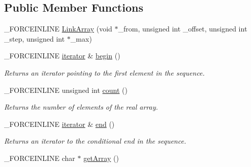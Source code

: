 \subsection*{Public Member Functions}
\begin{DoxyCompactItemize}
\item 
\-\_\-\-F\-O\-R\-C\-E\-I\-N\-L\-I\-N\-E \hyperlink{classbt_1_1_link_array_a1802ab66970e9ad9ab934acc5e391899}{Link\-Array} (void $\ast$\-\_\-from, unsigned int \-\_\-offset, unsigned int \-\_\-step, unsigned int $\ast$\-\_\-max)
\item 
\hypertarget{classbt_1_1_link_array_add85ea16f5d4e6cd0797c6d7ac547327}{\-\_\-\-F\-O\-R\-C\-E\-I\-N\-L\-I\-N\-E \hyperlink{classbt_1_1_link_array_1_1iterator}{iterator} \& \hyperlink{classbt_1_1_link_array_add85ea16f5d4e6cd0797c6d7ac547327}{begin} ()}\label{classbt_1_1_link_array_add85ea16f5d4e6cd0797c6d7ac547327}

\begin{DoxyCompactList}\small\item\em Returns an iterator pointing to the first element in the sequence. \end{DoxyCompactList}\item 
\hypertarget{classbt_1_1_link_array_a8dc1eea5b73b67867c02e471499af9a6}{\-\_\-\-F\-O\-R\-C\-E\-I\-N\-L\-I\-N\-E unsigned int \hyperlink{classbt_1_1_link_array_a8dc1eea5b73b67867c02e471499af9a6}{count} ()}\label{classbt_1_1_link_array_a8dc1eea5b73b67867c02e471499af9a6}

\begin{DoxyCompactList}\small\item\em Returns the number of elements of the real array. \end{DoxyCompactList}\item 
\hypertarget{classbt_1_1_link_array_a54b989bfe91f7557bb2371f0c00dfeb0}{\-\_\-\-F\-O\-R\-C\-E\-I\-N\-L\-I\-N\-E \hyperlink{classbt_1_1_link_array_1_1iterator}{iterator} \& \hyperlink{classbt_1_1_link_array_a54b989bfe91f7557bb2371f0c00dfeb0}{end} ()}\label{classbt_1_1_link_array_a54b989bfe91f7557bb2371f0c00dfeb0}

\begin{DoxyCompactList}\small\item\em Returns an iterator to the conditional end in the sequence. \end{DoxyCompactList}\item 
\hypertarget{classbt_1_1_link_array_a57b057b3e5629db7b468b66e949d7ccd}{\-\_\-\-F\-O\-R\-C\-E\-I\-N\-L\-I\-N\-E char $\ast$ \hyperlink{classbt_1_1_link_array_a57b057b3e5629db7b468b66e949d7ccd}{get\-Array} ()}\label{classbt_1_1_link_array_a57b057b3e5629db7b468b66e949d7ccd}


\end{DoxyCompactItemize}
